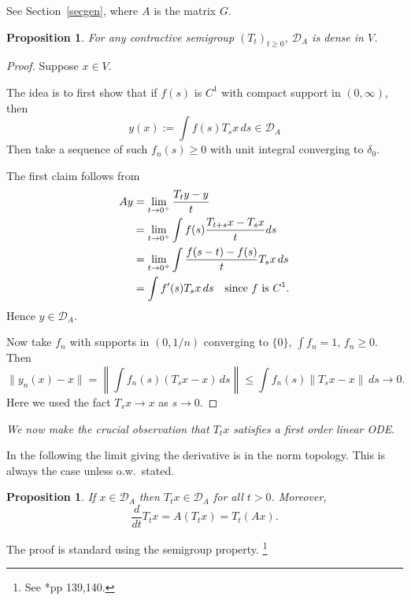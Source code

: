 \documentclass[a4paper]{amsart}
\theoremstyle{plain}
\newtheorem{proposition}[theorem]{Proposition}
\theoremstyle{definition}
\theoremstyle{remark}
\begin{document}
See Section~\ref{secgen}, where $ A $ is the matrix $ G $.

\begin{proposition}
For any contractive semigroup $ (T_t)_{t\geq 0} $,  $ \mathcal{D}_A $ is dense in $ V $.
\end{proposition}

\begin{proof} Suppose $ x \in V $.

The idea is to first show that if   $ f(s) $ is $  C^1 $ with compact support in $ (0,\infty) $, then 
\[
y(x) := \int f(s) T_sx \, ds \in \mathcal{D} _A 
\]
Then  take a sequence of such $ f_n(s) \geq 0$ with  
unit integral converging to $ \delta_0 $.

\medskip The first claim follows from
\begin{align*} 
Ay  &= \lim_{t\to 0^+} \frac{T_t y - y}{t}  \\
 &=  \lim_{t\to 0^+}\int f(s) \frac{T_{t+s}x -T_sx}{t} ds  \\
 &= \lim_{t\to 0^+} \int \frac{f(s-t)-f(s)}{t} T_s x\, ds \\
& =\int f'(s) T_s x \, ds \quad \text{since   $ f $ is $ C^1 $}.
\end{align*} 
Hence $ y \in \mathcal{D}_A$.  


\medskip Now take $ f_n $ with supports in $ (0,1/n) $ converging to $ \{0\} $,  $ \int f_n =1 $, $ f_n \geq 0 $.  Then
\[
\|y_n(x) - x \| = \left\| \int f_n(s) (T_s x-x ) \, ds \right\|  
 \leq \int f_n(s) \|T_s x - x \| \, ds \to 0.
\]
Here we used the fact $ T_s x \to x $ as $ s\to 0 $.
\end{proof} 

\bigskip
\emph{We now make the crucial observation that  $ T_t x $ satisfies a first order linear ODE}.

\medskip In the following the limit giving the derivative is in the norm topology.  This is always the case unless o.w.\ stated.

\begin{proposition}
If $ x \in \mathcal{D}_A $ then   $ T_t x  \in \mathcal{D}_A $ for all $ t>0 $.  Moreover,
\begin{equation} \label{tde}
\frac{d}{dt} T_t x = A (T_t x) = T_t (A x). 
\end{equation}
\end{proposition}

The proof is standard using the semigroup property.%
\footnote{See \cite{Lam}*{pp 139,140}.}

\end{document}
